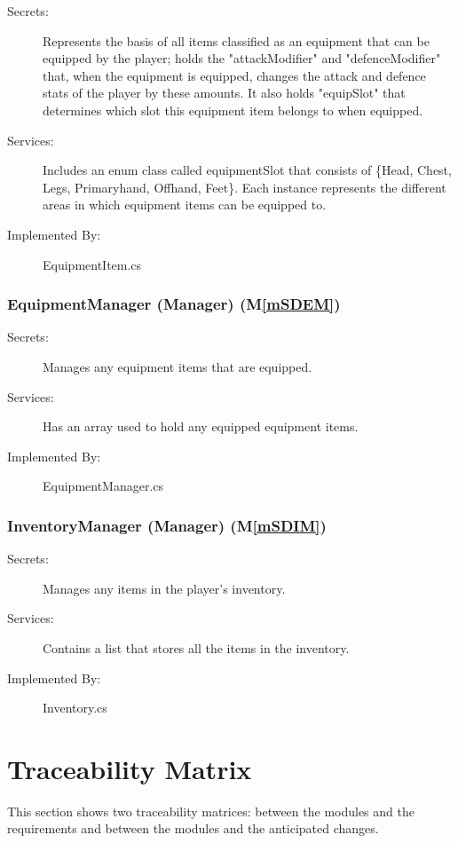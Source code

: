 \documentclass[12pt, titlepage]{article}
\newcommand{\mref}[1]{M\ref{#1}}
\begin{document}
\begin{description}
\item[Secrets:] Represents the basis of all items classified as an equipment that can be equipped by the player; holds the "attackModifier" and "defenceModifier" that, when the equipment is equipped, changes the attack and defence stats of the player by these amounts. It also holds "equipSlot" that determines which slot this equipment item belongs to when equipped.
\item[Services:] Includes an enum class called equipmentSlot that consists of \{Head, Chest, Legs, Primaryhand, Offhand, Feet\}. Each instance represents the different areas in which equipment items can be equipped to.
\item[Implemented By:] EquipmentItem.cs
\end{description}

\subsubsection{EquipmentManager (Manager) (\mref{mSDEM})}

\begin{description}
\item[Secrets:] Manages any equipment items that are equipped. 
\item[Services:] Has an array used to hold any equipped equipment items.
\item[Implemented By:] EquipmentManager.cs
\end{description}

\subsubsection{InventoryManager (Manager) (\mref{mSDIM})}

\begin{description}
\item[Secrets:] Manages any items in the player's inventory.
\item[Services:] Contains a list that stores all the items in the inventory.
\item[Implemented By:] Inventory.cs
\end{description}

\section{Traceability Matrix} \label{SecTM}

This section shows two traceability matrices: between the modules and the
requirements and between the modules and the anticipated changes.
\end{document}
